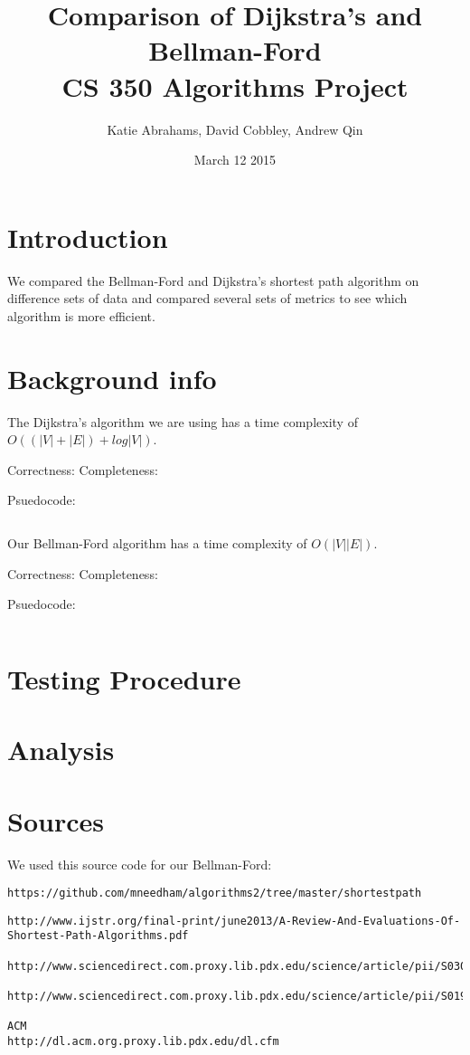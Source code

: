 \documentclass{article}
\title{Comparison of Dijkstra's and Bellman-Ford \\ CS 350 Algorithms Project}
\author{Katie Abrahams, David Cobbley, Andrew Qin}
\date{March 12 2015}
\begin{document}
\maketitle

\section{Introduction}

We compared the Bellman-Ford and Dijkstra's shortest path algorithm on difference sets of data and compared several sets of metrics to see which algorithm is more efficient.

\section{Background info}
The Dijkstra's algorithm we are using has a time complexity of $O((|V|+|E|)+log|V|)$.

Correctness:
Completeness:

Psuedocode:
\begin{verbatim}

\end{verbatim}

Our Bellman-Ford algorithm has a time complexity of $O(|V||E|)$.

Correctness:
Completeness:

Psuedocode:
\begin{verbatim}

\end{verbatim}
\section{Testing Procedure}

\section{Analysis}

\section{Sources}

We used this source code for our Bellman-Ford:
\begin{verbatim}
https://github.com/mneedham/algorithms2/tree/master/shortestpath
\end{verbatim}


\begin{verbatim}
http://www.ijstr.org/final-print/june2013/A-Review-And-Evaluations-Of-Shortest-Path-Algorithms.pdf

http://www.sciencedirect.com.proxy.lib.pdx.edu/science/article/pii/S0304397502006138#

http://www.sciencedirect.com.proxy.lib.pdx.edu/science/article/pii/S0196677403000464

ACM
http://dl.acm.org.proxy.lib.pdx.edu/dl.cfm
\end{verbatim}
\end{document}
